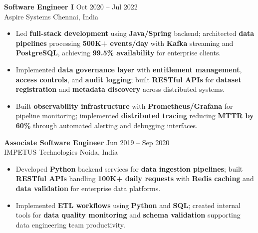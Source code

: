 \documentclass[letterpaper,10pt]{article}
\newcommand{\resumeItem}[1]{\item\small #1}
\newcommand{\resumeSubheading}[4]{
  \vspace{6pt}
  \noindent
  \textbf{#1} \hfill {\footnotesize #2} \\
  [-1pt]
  \noindent
  \small #3 \hfill {\small #4}
  \vspace{3pt}
}
\newcommand{\resumeItemsStart}{\vspace{-2pt}\begin{itemize}}
\newcommand{\resumeItemsEnd}{\end{itemize}\vspace{6pt}}
\begin{document}
\resumeSubheading
{Software Engineer I}{Oct 2020 -- Jul 2022}
{Aspire Systems}{Chennai, India}
\resumeItemsStart
\resumeItem{Led \textbf{full-stack development} using \textbf{Java/Spring} backend; architected \textbf{data pipelines} processing \textbf{500K+ events/day} with \textbf{Kafka} streaming and \textbf{PostgreSQL}, achieving \textbf{99.5\% availability} for enterprise clients.}
\resumeItem{Implemented \textbf{data governance layer} with \textbf{entitlement management}, \textbf{access controls}, and \textbf{audit logging}; built \textbf{RESTful APIs} for \textbf{dataset registration} and \textbf{metadata discovery} across distributed systems.}
\resumeItem{Built \textbf{observability infrastructure} with \textbf{Prometheus/Grafana} for pipeline monitoring; implemented \textbf{distributed tracing} reducing \textbf{MTTR by 60\%} through automated alerting and debugging interfaces.}
\resumeItemsEnd
\vspace{-12pt}

\resumeSubheading
{Associate Software Engineer}{Jun 2019 -- Sep 2020}
{IMPETUS Technologies}{Noida, India}
\resumeItemsStart
\resumeItem{Developed \textbf{Python} backend services for \textbf{data ingestion pipelines}; built \textbf{RESTful APIs} handling \textbf{100K+ daily requests} with \textbf{Redis caching} and \textbf{data validation} for enterprise data platforms.}
\resumeItem{Implemented \textbf{ETL workflows} using \textbf{Python} and \textbf{SQL}; created internal tools for \textbf{data quality monitoring} and \textbf{schema validation} supporting data engineering team productivity.}
\resumeItemsEnd
\vspace{-8pt}

\end{document}
